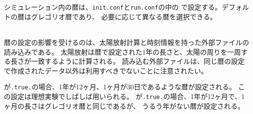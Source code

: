\section{\SecCommonSetting} \label{sec:common}

\subsection{\SubsecCalendarSetting} \label{subsec:calendar}
シミュレーション内の暦は、\verb|init.conf|と\verb|run.conf|の中の
で設定する。デフォルトの暦はグレゴリオ暦であり、
必要に応じて異なる暦を選択できる。

\\

暦の設定の影響を受けるのは、太陽放射計算と時刻情報を持った外部ファイルの読み込みである。
太陽放射は暦で設定された1年の長さと、太陽の周りを一周する長さが一致するように計算される。
読み込む外部ファイルは、同じ暦の設定で作成されたデータ以外は利用すべきでないことに注意されたい。

が\verb|.true.|の場合、1年が12ヶ月、1ヶ月が30日であるような暦が設定される。
この設定は理想実験でしばしば用いられる。
%
が\verb|.true.|の場合、1年が12ヶ月で、1ヶ月の長さはグレゴリオ暦と同じであるが、
うるう年がない暦が設定される。
